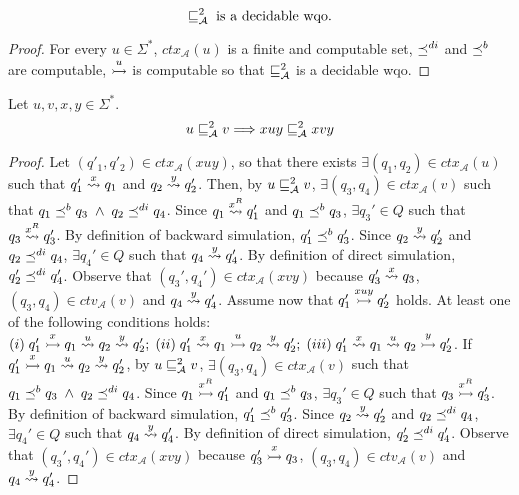 \begin{proposition}
\label{prop:wsdirf-wqo}
\[ \sqsubseteq_{\mathcal{A}}^{2} \; \textrm{is a decidable wqo.} \]
\end{proposition}

\begin{proof}
For every $u \in \Sigma^*$, $ctx_{\mathcal{A}}(u)$ is a finite and computable set,
$\preceq^{di}$ and $\preceq^b$ are computable, $ \overset{u}{\rightarrowtail}$ is computable
so that $\sqsubseteq_{\mathcal{A}}^{2}$ is a decidable wqo.
\end{proof}

\begin{proposition}[Monotonicity]
\label{proposition:monotonicity2}
Let $u,v,x,y \in \Sigma^*$.
\[ u \sqsubseteq_{\mathcal{A}}^{2} v \Longrightarrow xuy \sqsubseteq_{\mathcal{A}}^{2} xvy \]
\end{proposition}

\begin{proof}
Let $(q'_1, q'_2) \in ctx_{\mathcal{A}}(xuy)$, so that there exists $\exists(q_1, q_2) \in ctx_{\mathcal{A}}(u)$ such that
$q'_1 \overset{x}{\rightsquigarrow} q_1$ and
$q_2 \overset{y}{\rightsquigarrow} q'_2$.
Then, by $u \sqsubseteq_{\mathcal{A}}^{2} v$, $\exists (q_3,q_4) \in ctx_{\mathcal{A}}(v)$
such that $q_1 \preceq^b q_3 \; \wedge \; q_2 \preceq^{di} q_4$.
Since $q_1 \overset{x^R}{\rightsquigarrow} q_1'$ and $q_1 \preceq^b q_3$, $\exists q_3' \in Q$ such that
$q_3 \overset{x^R}{\rightsquigarrow} q_3'$.
By definition of backward simulation, $q_1' \preceq^b q_3'$.
Since $q_2 \overset{y}{\rightsquigarrow} q_2'$ and $q_2 \preceq^{di} q_4$, $\exists q_4' \in Q$ such that
$q_4 \overset{y}{\rightsquigarrow} q_4'$.
By definition of direct simulation, $q_2' \preceq^{di} q_4'$.
Observe that $(q_3',q_4') \in ctx_{\mathcal{A}}(xvy)$ because $q_3' \overset{x}{\rightsquigarrow} q_3$,
$(q_3,q_4) \in ctv_{\mathcal{A}}(v)$ and $q_4 \overset{y}{\rightsquigarrow} q_4'$.
Assume now that $q_1' \overset{xuy}{\rightarrowtail} q_2'$ holds.
At least one of the following conditions holds:
$ (i) \; q_1' \overset{x}{\rightarrowtail} q_1 \overset{u}{\rightsquigarrow} q_2 \overset{y}{\rightsquigarrow} q_2'; \;
 (ii) \; q_1' \overset{x}{\rightsquigarrow} q_1 \overset{u}{\rightarrowtail} q_2 \overset{y}{\rightsquigarrow} q_2'; \;
 (iii) \; q_1' \overset{x}{\rightsquigarrow} q_1 \overset{u}{\rightsquigarrow} q_2 \overset{y}{\rightarrowtail} q_2' $.
If $q_1' \overset{x}{\rightarrowtail} q_1 \overset{u}{\rightsquigarrow} q_2 \overset{y}{\rightsquigarrow} q_2'$, by $u \sqsubseteq_{\mathcal{A}}^{2} v$,
$\exists (q_3,q_4) \in ctx_{\mathcal{A}}(v)$ such that $q_1 \preceq^b q_3 \; \wedge \; q_2 \preceq^{di} q_4$.
Since $q_1 \overset{x^R}{\rightarrowtail} q_1'$ and $q_1 \preceq^b q_3$, $\exists q_3' \in Q$ such that
$q_3 \overset{x^R}{\rightarrowtail} q_3'$.
By definition of backward simulation, $q_1' \preceq^b q_3'$.
Since $q_2 \overset{y}{\rightsquigarrow} q_2'$ and $q_2 \preceq^{di} q_4$, $\exists q_4' \in Q$ such that
$q_4 \overset{y}{\rightsquigarrow} q_4'$.
By definition of direct simulation, $q_2' \preceq^{di} q_4'$.
Observe that $(q_3',q_4') \in ctx_{\mathcal{A}}(xvy)$ because $q_3' \overset{x}{\rightarrowtail} q_3$,
$(q_3,q_4) \in ctv_{\mathcal{A}}(v)$ and $q_4 \overset{y}{\rightsquigarrow} q_4'$.

\end{proof}
